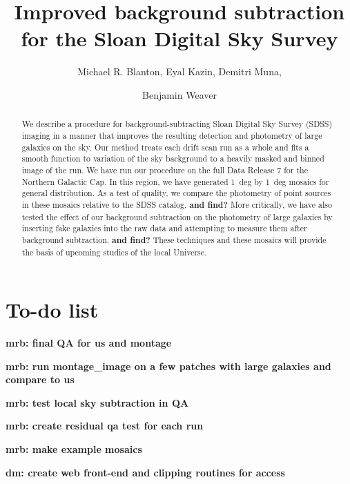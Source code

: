 \documentclass[10pt,preprint]{aastex}
\newcounter{address}
\begin{document}
\title{ Improved background subtraction for the Sloan Digital Sky Survey}


\author{
Michael R. Blanton\altaffilmark{\ref{NYU}},
Eyal Kazin\altaffilmark{\ref{NYU}},
Demitri Muna\altaffilmark{\ref{NYU}}, \and
Benjamin Weaver\altaffilmark{\ref{NYU}}
}

\setcounter{address}{1}

\begin{abstract}
We describe a procedure for background-subtracting Sloan Digital Sky
Survey (SDSS) imaging in a manner that improves the resulting
detection and photometry of large galaxies on the sky. Our method
treats each drift scan run as a whole and fits a smooth function to
variation of the sky background to a heavily masked and binned image
of the run. We have run our procedure on the full Data Release 7 for
the Northern Galactic Cap. In this region, we have generated 1~deg by
1~deg mosaics for general distribution. As a test of quality, we
compare the photometry of point sources in these mosaics relative to
the SDSS catalog. {\bf and find?} More critically, we have also tested
the effect of our background subtraction on the photometry of large
galaxies by inserting fake galaxies into the raw data and attempting
to measure them after background subtraction. {\bf and find?} These
techniques and these mosaics will provide the basis of upcoming
studies of the local Universe.
\end{abstract}

\section{ To-do list}

{\bf mrb: final QA for us and montage}

{\bf mrb: run montage\_image on a few patches with large galaxies and
compare to us}

{\bf mrb: test local sky subtraction in QA}

{\bf mrb: create residual qa test for each run}

{\bf mrb: make example mosaics}

{\bf dm: create web front-end and clipping routines for access}
\end{document}
